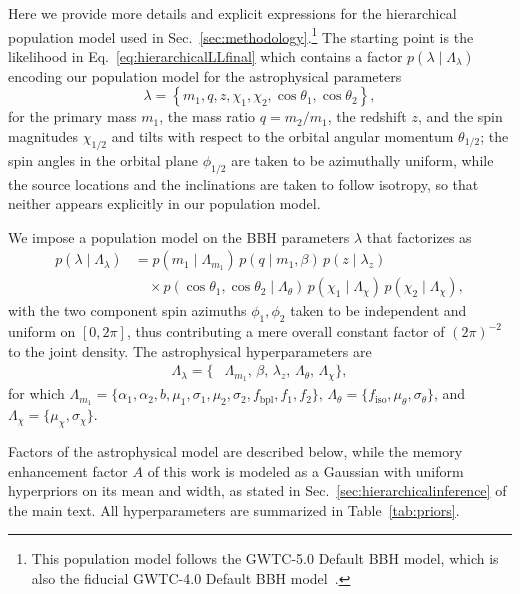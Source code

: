 \documentclass[aps,prd,reprint,twocolumn,10pt,eqsecnum,showpacs,nofootinbib,amsfonts,amssymb,amsmath,longbibliography,superscriptaddress,floatfix]{revtex4-1}
\begin{document}
Here we provide more details and explicit expressions for the hierarchical population model used in Sec.~\ref{sec:methodology}.\footnote{This population model follows the GWTC-5.0 Default BBH model, which is also the fiducial GWTC-4.0 Default BBH model~\cite{LIGOScientific:2025pvj,LIGOScientific:2026ctl}.}
%
The starting point is the likelihood in Eq.~\eqref{eq:hierarchicalLLfinal} which contains a factor $p(\lambda \mid \Lambda_\lambda)$ encoding our population model for the astrophysical parameters 
\begin{equation}
	\lambda = \left\{ m_1, q, z, \chi_1, \chi_2, \cos\theta_1, \cos \theta_2 \right\},
\end{equation}
for the primary mass $m_1$, the mass ratio $q = m_2/m_1$, the redshift $z$, and the spin magnitudes $\chi_{1/2}$ and tilts with respect to the orbital angular momentum $\theta_{1/2}$; the spin angles in the orbital plane $\phi_{1/2}$ are taken to be azimuthally uniform, while the source locations and the inclinations are taken to follow isotropy, so that neither appears explicitly in our population model.

We impose a population model on the BBH parameters $\lambda$ that factorizes as
\begin{align}
\label{eq:appendix-factorization}
p(\lambda \mid \Lambda_\lambda)
&= p(m_{1} \mid \Lambda_{m_{1}})\, p(q \mid m_{1}, \beta)\, p(z \mid \lambda_{z}) \\
&\quad \times p(\cos \theta_{1}, \cos \theta_{2} \mid \Lambda_{\theta})\,
p(\chi_{1} \mid \Lambda_{\chi})\, p(\chi_{2} \mid \Lambda_{\chi}), \nonumber
\end{align}
with the two component spin azimuths $\phi_{1}, \phi_{2}$ taken to be independent and uniform on $[0, 2\pi]$, thus contributing a mere overall constant factor of $(2\pi)^{-2}$ to the joint density. The astrophysical hyperparameters are
\begin{align}
\Lambda_{\lambda} = \big\{&\Lambda_{m_{1}},\, \beta,\, \lambda_{z},\, \Lambda_\theta,\, \Lambda_{\chi}\big\},
\end{align}
for which $\Lambda_{m_{1}} = \{\alpha_{1}, \alpha_{2}, b, \mu_{1}, \sigma_{1}, \mu_{2}, \sigma_{2}, f_{\mathrm{bpl}}, f_{1}, f_{2}\}$, $\Lambda_\theta = \{f_{\mathrm{iso}}, \mu_{\theta}, \sigma_{\theta}\}$, and $\Lambda_{\chi} = \{\mu_{\chi}, \sigma_{\chi}\}$.

Factors of the astrophysical model are described below, while
the memory enhancement factor $A$ of this work is modeled as a Gaussian with uniform hyperpriors on its mean and width, as stated in Sec.~\ref{sec:hierarchicalinference} of the main text. 
All hyperparameters are summarized in Table~\ref{tab:priors}.
\end{document}
